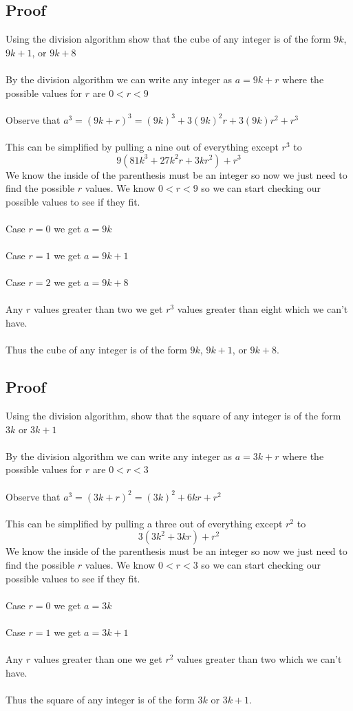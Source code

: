 \documentclass{article}
\begin{document}
\subsection{Proof}
Using the division algorithm show that the cube of any integer is of the form $9k$, $9k+1$, or $9k+8$\\\\
By the division algorithm we can write any integer as $a = 9k + r$ where the possible values for $r$ are $0 < r < 9$\\\\
Observe that $a^3 = (9k + r)^3 = (9k)^3 + 3(9k)^2r + 3(9k)r^2 + r^3$\\\\
This can be simplified by pulling a nine out of everything except $r^3$ to $$9(81k^3+27k^2r+3kr^2) + r^3$$
We know the inside of the parenthesis must be an integer so now we just need to find the possible $r$ values. We know $0 < r < 9$ so we can start checking our possible values to see if they fit. 
\\\\
Case $r=0$ we get $a=9k$
\\\\
Case $r=1$ we get $a=9k+1$
\\\\
Case $r=2$ we get $a=9k+8$
\\\\
Any $r$ values greater than two we get $r^3$ values greater than eight which we can't have.
\\\\
Thus the cube of any integer is of the form $9k$, $9k+1$, or $9k+8$.

\subsection{Proof}
Using the division algorithm, show that the square of any integer is of the form $3k$ or $3k+1$
\\\\
By the division algorithm we can write any integer as $a = 3k + r$ where the possible values for $r$ are $0 < r < 3$\\\\
Observe that $a^3 = (3k + r)^2 = (3k)^2 + 6kr + r^2$\\\\
This can be simplified by pulling a three out of everything except $r^2$ to $$3(3k^2+3kr) + r^2$$
We know the inside of the parenthesis must be an integer so now we just need to find the possible $r$ values. We know $0 < r < 3$ so we can start checking our possible values to see if they fit. 
\\\\
Case $r=0$ we get $a=3k$
\\\\
Case $r=1$ we get $a=3k+1$
\\\\
Any $r$ values greater than one we get $r^2$ values greater than two which we can't have.
\\\\
Thus the square of any integer is of the form $3k$ or $3k+1$.
\end{document}
